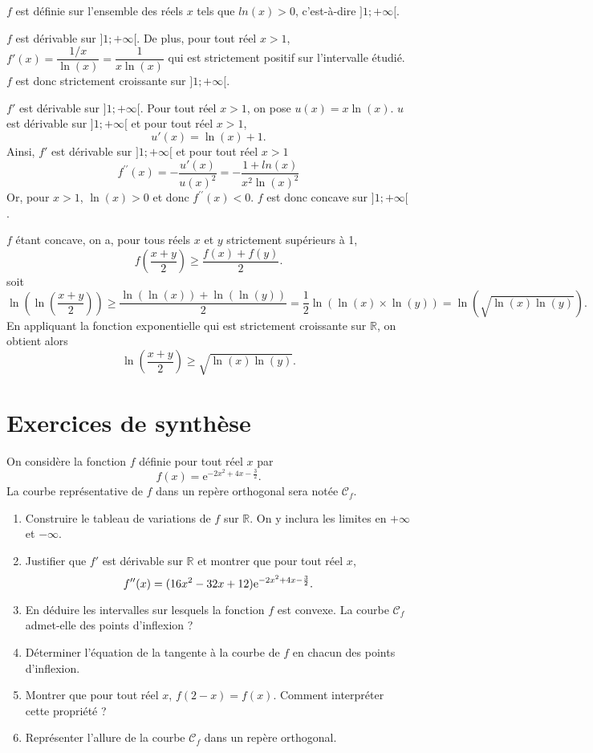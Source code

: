 \documentclass[11pt,fleqn, openany]{book} %
\begin{document}
\begin{solution}
\(f\) est définie sur l'ensemble des réels \(x\) tels que \(ln(x)>0\), c'est-à-dire \(]1;+\infty[\).

\(f\) est dérivable sur  \(]1;+\infty[\). De plus, pour tout réel \(x>1\), \(f'(x)=\dfrac{1/x}{\ln(x)}=\dfrac{1}{x\ln(x)}\) qui est strictement positif sur l'intervalle étudié. \(f\) est donc strictement croissante sur \(]1;+\infty[\).

\(f'\) est dérivable sur \(]1;+\infty[\). Pour tout réel \(x>1\), on pose \(u(x)=x\ln(x)\). \(u\) est dérivable sur \(]1;+\infty[\) et pour tout réel \(x>1\),
\[u'(x)=\ln(x)+1.\]
Ainsi, \(f'\) est dérivable sur \(]1;+\infty[\) et pour tout réel \(x>1\)
\[f^{\prime\prime}(x)= -\dfrac{u'(x)}{u(x)^2}=-\dfrac{1+ln(x)}{x^2\ln(x)^2}\]
Or, pour \(x>1\), \(\ln(x)>0\) et donc \(f^{\prime\prime}(x)<0\).  \(f\) est donc concave sur \(]1;+\infty[\).

\(f\) étant concave, on a, pour tous réels \(x\) et \(y\) strictement supérieurs à 1,
\[f\left(\dfrac{x+y}{2}\right) \geqslant \dfrac{f(x)+f(y)}{2}.\] 
soit
\[\ln\left(\ln\left(\dfrac{x+y}{2}\right)\right) \geqslant \dfrac{\ln(\ln(x))+\ln(\ln(y))}{2}=\dfrac{1}{2}\ln\left( \ln(x) \times \ln(y)\right)=\ln\left(\sqrt{\ln(x)\ln(y)}\right) .\] 
En appliquant la fonction exponentielle qui est strictement croissante sur \(\mathbb{R}\), on obtient alors
\[ \ln \left( \dfrac{x+y}{2}\right) \geqslant \sqrt{\ln(x)\ln(y)} .\]\end{solution}





\section*{Exercices de synthèse}



\begin{exercise}
On considère la fonction $f$ définie pour tout réel $x$ par
\[ f(x)=\mathrm{e}^{-2x^2+4x-\frac{3}{2}}.\]
La courbe représentative de $f$ dans un repère orthogonal sera notée $\mathcal{C}_f$.
\vskip5pt
\begin{enumerate}
\item Construire le tableau de variations de $f$ sur $\mathbb{R}$. On y inclura les limites en $+\infty$ et $-\infty$.

\item Justifier que $f'$ est dérivable sur $\mathbb{R}$ et montrer que pour tout réel $x$, 
\[ f''(x)=(16x^2-32x+12)\mathrm{e}^{-2x^2+4x-\frac{3}{2}}.\]
\item En déduire les intervalles sur lesquels la fonction $f$ est convexe. La courbe $\mathcal{C}_f$ admet-elle des points d'inflexion ?
\item Déterminer l'équation de la tangente à la courbe de $f$ en chacun des points d'inflexion.
\item Montrer que pour tout réel $x$, $f(2-x)=f(x)$. Comment interpréter cette propriété ?
\item Représenter l'allure de la courbe $\mathcal{C}_f$ dans un repère orthogonal.\end{enumerate}\end{exercise}
\end{document}
